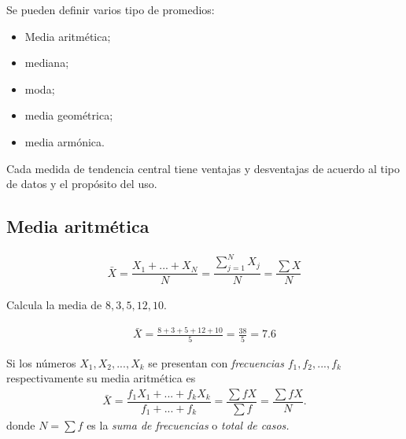 Se pueden definir varios tipo de promedios: 
\begin{itemize}
	\item Media aritmética;
	\item mediana;
	\item moda;
	\item media geométrica;
	\item media armónica.
\end{itemize}



\begin{observacion}
	Cada medida de tendencia central tiene ventajas y desventajas de acuerdo al tipo de datos y el propósito del uso.
\end{observacion}


\subsection{Media aritmética}

\begin{definicion}
	\begin{align}
		\label{eq:1.2.1}
		\bar{X} =\dfrac{X_{1}+...+X_{N}}{N} = \dfrac{\sum_{j=1}^{N}X_{j}}{N}=\dfrac{\sum X}{N}
	\end{align}
\end{definicion}



\begin{ejemplo}
	Calcula la media de $8,3,5,12,10$.
\end{ejemplo}

\begin{solucion}
	\begin{align}
		\bar{X} = \frac{8+3+5+12+10}{5} = \frac{38}{5} = 7.6
	\end{align}
\end{solucion}




Si los números $X_{1},X_{2},...,X_{k}$ se presentan con \emph{frecuencias} $f_{1}, f_{2},...,f_{k}$ respectivamente su media aritmética es
\begin{align}
	\label{eq:1.2.2}
	\bar{X}=\dfrac{f_{1}X_{1}+...+f_{k}X_{k}}{f_{1}+...+f_{k}}=\dfrac{\sum fX}{\sum f}=\dfrac{\sum fX}{N}.
\end{align}
donde $N=\sum f$ es la \emph{suma de frecuencias} o \emph{total de casos.}


